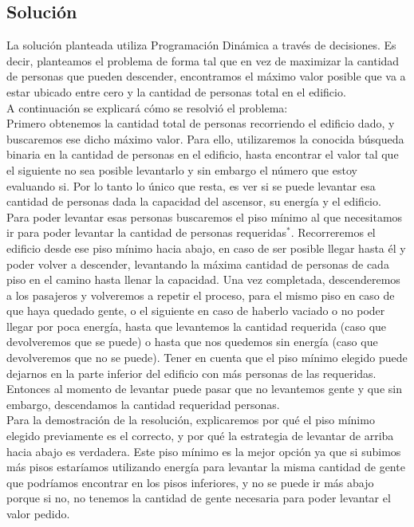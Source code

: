 \subsection{Soluci\'on}
La solución planteada utiliza Programación Dinámica a través de decisiones. Es decir, planteamos el problema de forma tal que en vez de maximizar la cantidad de personas que 
pueden descender, encontramos el máximo valor posible que va a estar ubicado entre cero y la cantidad de personas total en el edificio.\\
A continuación se explicará cómo se resolvió el problema:\\
Primero obtenemos la cantidad total de personas recorriendo el edificio dado, y buscaremos ese dicho máximo valor.
Para ello, utilizaremos la conocida búsqueda binaria en la cantidad de personas en el edificio, hasta encontrar el valor tal que el siguiente no sea posible levantarlo y sin embargo el número que estoy evaluando si.
Por lo tanto lo único que resta, es ver si se puede levantar esa cantidad de personas dada la capacidad del ascensor, su energía y el edificio. \\
Para poder levantar esas personas buscaremos el piso mínimo al que necesitamos ir para poder levantar la cantidad de personas requeridas$^*$. Recorreremos el edificio desde ese piso mínimo hacia abajo, en caso de
ser posible llegar hasta él y poder volver a descender, levantando la máxima cantidad de personas de cada piso en el camino hasta llenar la capacidad. Una vez completada, descenderemos a los pasajeros y volveremos a repetir el proceso,
para el mismo piso en caso de que haya quedado gente, o el siguiente en caso de haberlo vaciado o no poder llegar por poca energía, hasta que levantemos la cantidad requerida (caso que devolveremos que se puede) o hasta que nos quedemos sin energía (caso que devolveremos que no se puede). Tener en cuenta que el piso mínimo elegido puede dejarnos en la parte inferior del edificio con más personas de las requeridas. Entonces al momento de levantar puede pasar que no levantemos gente y que sin embargo, descendamos la cantidad requeridad personas.\\
Para la demostración de la resolución, explicaremos por qué el piso mínimo elegido previamente es el correcto, y por qué la estrategia de levantar de arriba hacia abajo es verdadera.
Este piso mínimo es la mejor opción ya que si subimos más pisos estaríamos utilizando energía para levantar la misma cantidad de gente que podríamos encontrar en los pisos
inferiores, y no se puede ir más abajo porque si no, no tenemos la cantidad de gente necesaria para poder levantar el valor pedido.\\
